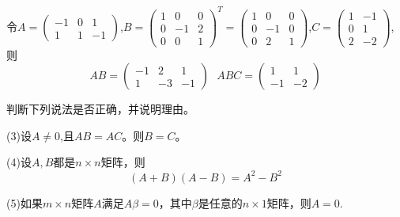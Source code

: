 \documentclass[a4paper]{report}
\begin{document}
\begin{jie}
令$A=\begin{pmatrix}
-1&0&1\\ 1&1&-1
\end{pmatrix}$,$B=\begin{pmatrix}
1&0&0\\ 0&-1&2\\ 0&0&1
\end{pmatrix}^{T}=\begin{pmatrix}
1&0&0\\ 0&-1&0\\ 0&2&1
\end{pmatrix}$,$C=\begin{pmatrix}
1&-1\\ 0&1\\ 2&-2
\end{pmatrix}$,则
\begin{equation*}
  AB=\begin{pmatrix}
-1&2&1\\ 1&-3&-1
\end{pmatrix}~~~
ABC=\begin{pmatrix}
1&1\\ -1&-2
\end{pmatrix}
\end{equation*}
\end{jie}

\EX 判断下列说法是否正确，并说明理由。

(3)设$A\neq 0$,且$AB=AC$。则$B=C$。

(4)设$A,B$都是$n\times n$矩阵，则
\begin{equation*}
  (A+B)(A-B)=A^2-B^2
\end{equation*}

(5)如果$m\times n$矩阵$A$满足$A\beta=0$，其中$\beta$是任意的$n\times 1$矩阵，则$A=0$.
\end{document}
